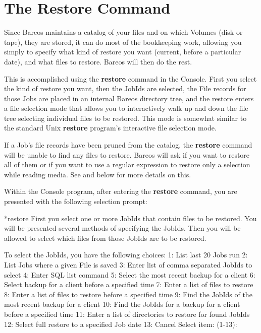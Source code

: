 \label{Example1}
\section{The Restore Command}

Since Bareos maintains a catalog of your files and on which Volumes (disk or
tape), they are stored, it can do most of the bookkeeping work, allowing you
simply to specify what kind of restore you want (current, before a particular
date), and what files to restore. Bareos will then do the rest.

This is accomplished using the {\bf restore} command in the Console. First you
select the kind of restore you want, then the JobIds are selected,
the File records for those Jobs are placed in an internal Bareos directory
tree, and the restore enters a file selection mode that allows you to
interactively walk up and down the file tree selecting individual files to be
restored. This mode is somewhat similar to the standard Unix {\bf restore}
program's interactive file selection mode.

If a Job's file records have been pruned from the catalog, the {\bf restore}
command will be unable to find any files to restore. Bareos will ask if you
want to restore all of them or if you want to use a regular expression to
restore only a selection while reading media.
See  and below for more details on this.

Within the Console program, after entering the {\bf restore} command, you are
presented with the following selection prompt:

\begin{bconsole}{*}{restore}{}{}
First you select one or more JobIds that contain files
to be restored. You will be presented several methods
of specifying the JobIds. Then you will be allowed to
select which files from those JobIds are to be restored.

To select the JobIds, you have the following choices:
     1: List last 20 Jobs run
     2: List Jobs where a given File is saved
     3: Enter list of comma separated JobIds to select
     4: Enter SQL list command
     5: Select the most recent backup for a client
     6: Select backup for a client before a specified time
     7: Enter a list of files to restore
     8: Enter a list of files to restore before a specified time
     9: Find the JobIds of the most recent backup for a client
    10: Find the JobIds for a backup for a client before a specified time
    11: Enter a list of directories to restore for found JobIds
    12: Select full restore to a specified Job date
    13: Cancel
Select item:  (1-13):
\end{bconsole}

